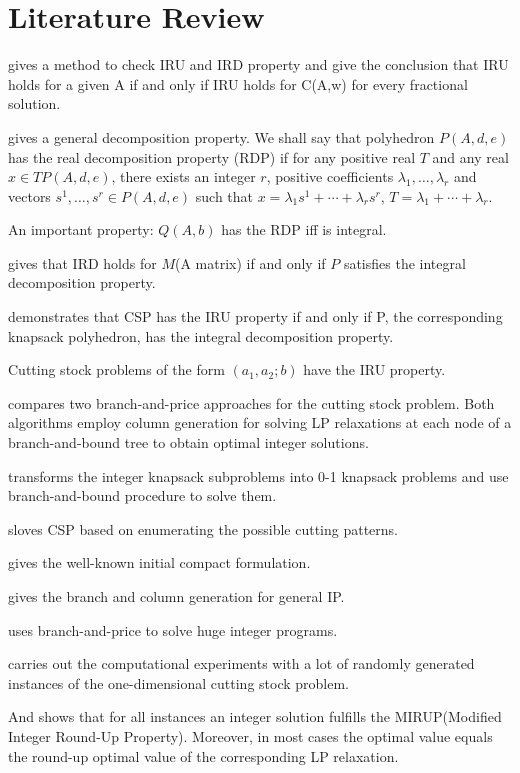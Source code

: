\section{Literature Review}

\cite{baum1982finite} gives a method to check IRU and IRD property
and give the conclusion that IRU holds for a given A if and only if IRU holds for
C(A,w) for every fractional solution.

\cite{de1984decomposition} gives a general decomposition property.
We shall say that polyhedron $P(A, d, e)$ has the real decomposition property (RDP) if for any positive real $T$ and any real $x \in TP(A, d, e)$, there exists an integer $r$, positive coefficients $\lambda_1, \ldots, \lambda_r$ and
vectors $s^1,\ldots,s^r \in P(A,d,e)$ such that $x = \lambda_1 s^1 +\cdots + \lambda_r s^r$, $T = \lambda_1 + \cdots + \lambda_r$.

An important property: $Q(A, b)$ has the RDP iff is integral.

\cite{baum1981integer} gives that IRD holds for $M$(A matrix) if and only if $P$ satisfies the integral decomposition property.

\cite{marcotte1985cutting} demonstrates that
CSP has the IRU property if and only if P, the corresponding knapsack polyhedron,
has the integral decomposition property.

Cutting stock problems of the form $(a_1,a_2;b)$ have the IRU property.

\cite{vance1998branch} compares two branch-and-price approaches for the cutting stock problem. Both algorithms employ column generation for solving LP relaxations at each node of a branch-and-bound tree to obtain optimal integer solutions.

\cite{vanderbeck1999computational} transforms the integer knapsack subproblems into 0-1 knapsack problems and use branch-and-bound procedure to solve them.

\cite{goulimis1990optimal} sloves CSP based on enumerating the possible cutting patterns.

\cite{gilmore1961linear} gives the well-known initial compact formulation.

\cite{vanderbeck1996exact} gives the branch and column generation for general IP.

\cite{barnhart1998branch} uses branch-and-price to solve huge integer programs.

\cite{scheithauer1995modified} carries out the computational experiments with a lot of randomly generated instances of the one-dimensional cutting stock problem. 

And shows that for all instances an integer solution fulfills the MIRUP(Modified Integer Round-Up Property). Moreover, in most cases the optimal value equals the round-up optimal value of the corresponding LP relaxation.

%
%
% 


\newpage
